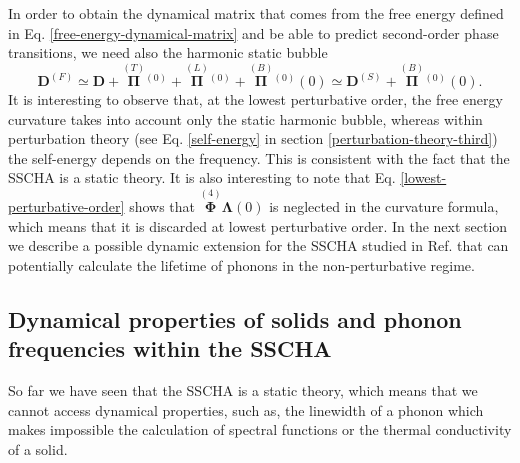 In order to obtain the dynamical matrix that comes from the free energy defined in Eq. \ref{free-energy-dynamical-matrix} and be able to predict second-order phase transitions, we need also the harmonic static bubble
\begin{equation}
 \label{lowest-perturbative-order}
 \mathbf{D}^{(F)}\simeq\mathbf{D}+\overset{(T)}{\boldsymbol{\Pi}}{}^{(0)}+\overset{(L)}{\boldsymbol{\Pi}}{}^{(0)}+\overset{(B)}{\boldsymbol{\Pi}}{}^{(0)}(0)\simeq\mathbf{D}^{(S)}+\overset{(B)}{\boldsymbol{\Pi}}{}^{(0)}(0).
\end{equation}  
It is interesting to observe that, at the lowest perturbative order, the free energy curvature takes into account only the static harmonic bubble, whereas within perturbation theory (see Eq. \ref{self-energy} 
in section \ref{perturbation-theory-third}) the self-energy depends on the frequency. This is consistent with the fact that the SSCHA is a static theory. It is also interesting to note 
that Eq. \ref{lowest-perturbative-order} shows that $\overset{(4)}{\boldsymbol{\Phi}}\boldsymbol{\Lambda}(0)$ is neglected in the curvature formula, which means that it is discarded at lowest perturbative order. 
In the next section we describe a possible dynamic extension for the SSCHA studied in Ref. \cite{bianco2017second} that can potentially calculate the lifetime of phonons in the non-perturbative regime.
 
\subsection{Dynamical properties of solids and phonon frequencies within the SSCHA}
\label{dynamical-sscha}

So far we have seen that the SSCHA is a static theory, which means that we cannot access dynamical properties, such as, the linewidth of a phonon which makes impossible the calculation of spectral functions or 
the thermal conductivity of a solid. \\

